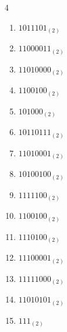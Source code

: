 \begin{multicols}{4}
\begin{enumerate}
        \phantom{$=20$}

  \item $1011101_{(2)}$

        \phantom{$=93$}

\columnbreak %

  \item $11000011_{(2)}$

        \phantom{$=195$}

  \item $11010000_{(2)}$

        \phantom{$=208$}

  \item $1100100_{(2)}$

        \phantom{$=100$}

  \item $101000_{(2)}$

        \phantom{$=40$}

  \item $10110111_{(2)}$

        \phantom{$=183$}

  \item $11010001_{(2)}$

        \phantom{$=209$}

  \item $10100100_{(2)}$

        \phantom{$=164$}

  \item $1111100_{(2)}$

        \phantom{$=124$}

  \item $1100100_{(2)}$

        \phantom{$=100$}

  \item $1110100_{(2)}$

        \phantom{$=116$}

  \item $11100001_{(2)}$

        \phantom{$=225$}

  \item $11111000_{(2)}$

        \phantom{$=248$}

  \item $11010101_{(2)}$

        \phantom{$=213$}

  \item $111_{(2)}$


\end{enumerate}
\end{multicols}
